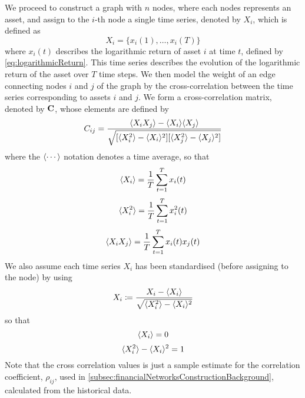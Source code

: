We proceed to construct a graph with $n$ nodes, where each nodes represents an asset, and assign to the $i$-th node a single time series, denoted by $X_{i}$, which is defined as
\begin{equation}
	\label{eq:singleTimeSeries}
	X_{i} = \{x_{i}(1),\dots,x_{i}(T)\}
\end{equation}
where $x_{i}(t)$ describes the logarithmic return of asset $i$ at time $t$, defined by \cref{eq:logarithmicReturn}.
This time series describes the evolution of the logarithmic return of the asset over $T$ time steps.
We then model the weight of an edge connecting nodes $i$ and $j$ of the graph by the cross-correlation between the time series corresponding to assets $i$ and $j$.
We form a cross-correlation matrix, denoted by $\mathbf C$, whose elements are defined by
\begin{equation}
	\label{eq:crossCorrelationMatrix}
	C_{ij} = \frac{\langle X_{i} X_{j}\rangle - \langle X_{i}\rangle \langle X_{j}\rangle}{\sqrt{[\langle X_{i}^{2}\rangle - \langle X_{i}\rangle^{2}][\langle X_{j}^{2}\rangle - \langle X_{j}\rangle^{2}]}}
\end{equation}
where the $\langle\cdots\rangle$ notation denotes a time average, so that
\begin{equation}
	\label{eq:temporalMean}
	\langle X_{i}\rangle = \frac{1}{T} \sum_{t=1}^{T} x_{i}(t)
\end{equation}
\begin{equation}
	\label{eq:temporalMeanSquare}
	\langle X_{i}^{2}\rangle = \frac{1}{T} \sum_{t=1}^{T} x_{i}^{2}(t)
\end{equation}
\begin{equation}
	\label{eq:temporalMeanProduct}
	\langle X_{i}X_{j}\rangle = \frac{1}{T} \sum_{t=1}^{T} x_{i}(t)x_{j}(t)
\end{equation}
We also assume each time series $X_{i}$ has been standardised (before assigning to the node) by using
\begin{equation}
	\label{eq:standardiseTimeSeries}
	X_{i} \coloneqq \frac{X_{i} - \langle X_{i}\rangle}{\sqrt{\langle X_{i}^{2}\rangle - \langle X_{i}\rangle^{2}}}
\end{equation}
so that
\begin{equation}
	\label{eq:zeroTemporalMean}
	\langle X_{i}\rangle = 0
\end{equation}
\begin{equation}
	\label{eq:unitTemporalVariance}
	\langle X_{i}^{2}\rangle - \langle X_{i}\rangle^{2} = 1
\end{equation}
Note that the cross correlation values is just a sample estimate for the correlation coefficient, $\rho_{ij}$, used in \cref{subsec:financialNetworksConstructionBackground}, calculated from the historical data.

